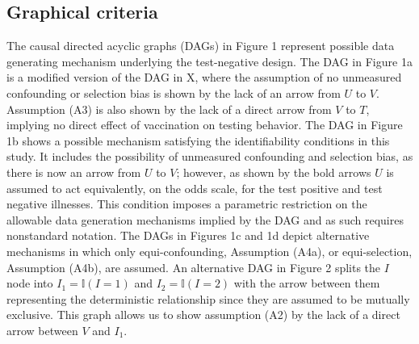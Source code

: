 \documentclass[11pt]{article}
\begin{document}
\subsection{Graphical criteria} \label{sec:graphical}
The causal directed acyclic graphs (DAGs) in Figure 1 represent possible data generating mechanism underlying the test-negative design. The DAG in Figure 1a is a modified version of the DAG in X, where the assumption of no unmeasured confounding or selection bias is shown by the lack of an arrow from $U$ to $V$. Assumption (A3) is also shown by the lack of a direct arrow from $V$ to $T$, implying no direct effect of vaccination on testing behavior. The DAG in Figure 1b shows a possible mechanism satisfying the identifiability conditions in this study. It includes the possibility of unmeasured confounding and selection bias, as there is now an arrow from $U$ to $V$; however, as shown by the bold arrows $U$ is assumed to act equivalently, on the odds scale, for the test positive and test negative illnesses. This condition imposes a parametric restriction on the allowable data generation mechanisms implied by the DAG and as such requires nonstandard notation. The DAGs in Figures 1c and 1d depict alternative mechanisms in which only equi-confounding, Assumption (A4a), or equi-selection, Assumption (A4b), are assumed. An alternative DAG in Figure 2 splits the $I$ node into $I_1 = \mathbb{I}(I = 1)$ and $I_2 = \mathbb{I}(I = 2)$ with the arrow between them representing the deterministic relationship since they are assumed to be mutually exclusive. This graph allows us to show assumption (A2) by the lack of a direct arrow between $V$ and $I_1$. 
\end{document}
